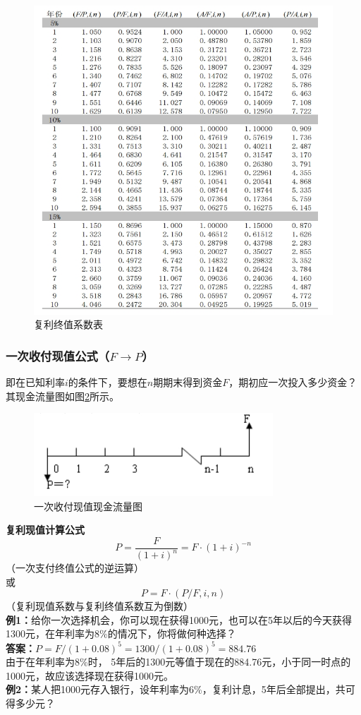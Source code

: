 \documentclass[12pt, a4paper, oneside]{ctexbook}
\begin{document}
\begin{figure}[H]
    \centering
    \includegraphics[width=\textwidth]{image/复利终值系数表.png}
    \caption{复利终值系数表}
    \label{fig:5}
\end{figure}

\subsubsection{一次收付现值公式（$F \to P$）}
即在已知利率$i$的条件下，要想在$n$期期末得到资金$F$，期初应一次投入多少资金？其现金流量图如图\ref{fig:6}所示。

\begin{figure}[H]
    \centering
    \includegraphics[width=0.8\textwidth]{image/一次收付现值现金流量图.png}
    \caption{一次收付现值现金流量图}
    \label{fig:6}
\end{figure}

\textbf{复利现值计算公式}
$$P=\frac{F}{(1+i)^n}=F \cdot (1+i)^{-n}$$（一次支付终值公式的逆运算）\\
或
$$P=F \cdot (P/F,i,n)$$（复利现值系数与复利终值系数互为倒数）\\
\textbf{例1：}给你一次选择机会，你可以现在获得1000元，也可以在5年以后的今天获得1300元，在年利率为8\%的情况下，你将做何种选择？\\
\textbf{答案：}$P=F/(1+0.08)^5=1300/(1+0.08)^5=884.76$\\
由于在年利率为8\%时， 5年后的1300元等值于现在的884.76元，小于同一时点的1000元，故应该选择现在获得1000元。\\
\textbf{例2：}某人把1000元存入银行，设年利率为6\%，复利计息，5年后全部提出，共可得多少元？
\end{document}
